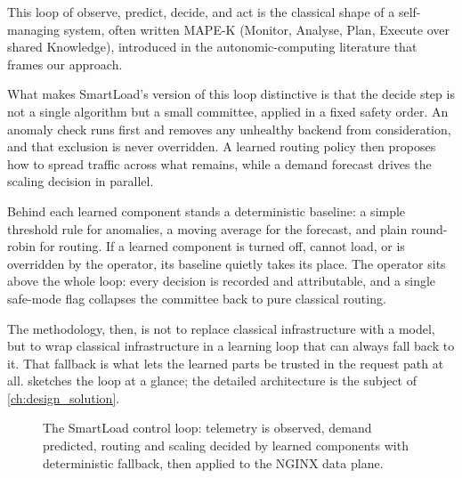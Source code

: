 This loop of observe, predict, decide, and act is the classical shape of a
self-managing system, often written MAPE-K (Monitor, Analyse, Plan, Execute over
shared Knowledge), introduced in the autonomic-computing literature
\cite{kephart2003autonomic} that frames our approach.

What makes SmartLoad's version of this loop distinctive is that the decide step is
not a single algorithm but a small committee, applied in a fixed safety order. An
anomaly check runs first and removes any unhealthy backend from consideration,
and that exclusion is never overridden. A learned routing policy then proposes how
to spread traffic across what remains, while a demand forecast drives the scaling
decision in parallel.

Behind each learned component stands a deterministic baseline: a simple threshold
rule for anomalies, a moving average for the forecast, and plain round-robin for
routing. If a learned component is turned off, cannot load, or is overridden by
the operator, its baseline quietly takes its place. The operator sits above the
whole loop: every decision is recorded and attributable, and a single safe-mode
flag collapses the committee back to pure classical routing.

The methodology, then, is not to replace classical infrastructure with a model,
but to wrap classical infrastructure in a learning loop that can always fall back
to it. That fallback is what lets the learned parts be trusted in the request path
at all.  sketches the loop at a glance; the detailed
architecture is the subject of \cref{ch:design_solution}.

\begin{figure}[H]
\centering
{}
\caption[The SmartLoad observe-predict-decide-act control loop]{The SmartLoad control loop: telemetry is observed, demand predicted, routing and scaling decided by learned components with deterministic fallback, then applied to the NGINX data plane.}
\label{fig:intro:loop}
\end{figure}

